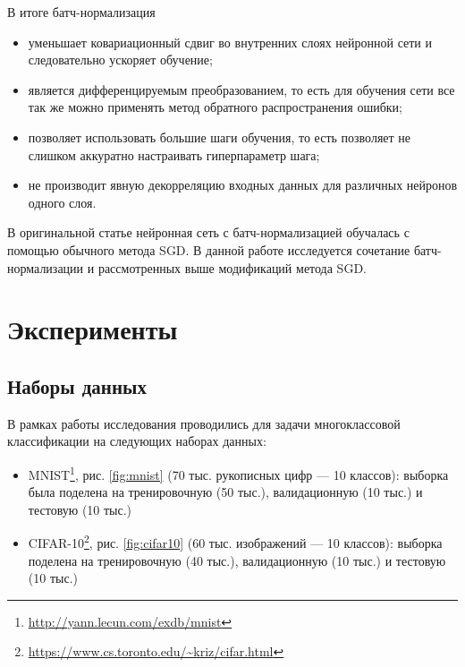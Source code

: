 \documentclass[12pt]{article}
\begin{document}
В итоге батч-нормализация

\begin{itemize}
\item уменьшает ковариационный сдвиг во внутренних слоях нейронной сети и следовательно ускоряет обучение;
\item является дифференцируемым преобразованием, то есть для обучения сети все так же можно применять метод обратного распространения ошибки;
\item позволяет использовать большие шаги обучения, то есть позволяет не слишком аккуратно настраивать гиперпараметр шага;
\item не производит явную декорреляцию входных данных для различных нейронов одного слоя.
\end{itemize}


В оригинальной статье \cite{BN} нейронная сеть с батч-нормализацией обучалась с помощью обычного метода SGD. В данной работе исследуется сочетание батч-нормализации и рассмотренных выше модификаций метода SGD.


\section{Эксперименты}

\subsection{Наборы данных} \label{datasets}

В рамках работы исследования проводились для задачи многоклассовой классификации на следующих наборах данных:

\begin{itemize}
\item MNIST\footnote{\url{http://yann.lecun.com/exdb/mnist}}, рис. \ref{fig:mnist} (70 тыс. рукописных цифр --- 10 классов): выборка была поделена на тренировочную (50 тыс.), валидационную (10 тыс.) и тестовую (10 тыс.)
 
\item CIFAR-10\footnote{\url{https://www.cs.toronto.edu/~kriz/cifar.html}}, рис. \ref{fig:cifar10} (60 тыс. изображений --- 10 классов): выборка поделена на тренировочную (40 тыс.), валидационную (10 тыс.) и тестовую (10 тыс.)
\end{itemize}
\end{document}
